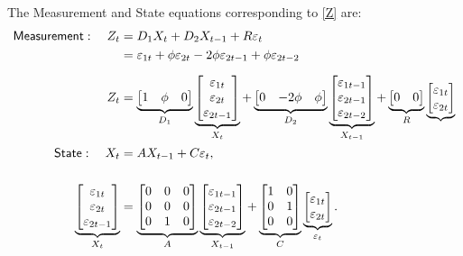 \documentclass[a4paper,12pt]{article}
\newcommand{\bsq}{\begin{subequations}}\newcommand{\esq}{\end{subequations}}
\begin{document}
The Measurement and State equations corresponding to \ref{Z} are:\bsq\label%
{K0SSM}%
\begin{align}
\mathsf{Measurement}:\quad Z_{t}& =D_{1}X_{t}+D_{2}X_{t-1}+R\varepsilon _{t}
\notag \\
& =\varepsilon _{1t}+\phi \varepsilon _{2t}-2\phi \varepsilon _{2t-1}+\phi
\varepsilon _{2t-2} \\[2mm]
Z_{t}& =\underbrace{%
\begin{bmatrix}
1 & \phi  & 0%
\end{bmatrix}%
}_{D_{1}}\underbrace{%
\begin{bmatrix}
\varepsilon _{1t} \\ 
\varepsilon _{2t} \\ 
\varepsilon _{2t-1}%
\end{bmatrix}%
}_{X_{t}}+\underbrace{%
\begin{bmatrix}
0 & -2\phi  & \phi 
\end{bmatrix}%
}_{D_{2}}\underbrace{%
\begin{bmatrix}
\varepsilon _{1t-1} \\ 
\varepsilon _{2t-1} \\ 
\varepsilon _{2t-2}%
\end{bmatrix}%
}_{X_{t-1}}+\underbrace{%
\begin{bmatrix}
0 & 0%
\end{bmatrix}%
}_{R}\underbrace{%
\begin{bmatrix}
\varepsilon _{1t} \\ 
\varepsilon _{2t}%
\end{bmatrix}%
} \\
\mathsf{State}:\quad X_{t}& =AX_{t-1}+C\varepsilon _{t},  \notag \\[5mm]
\underbrace{%
\begin{bmatrix}
\varepsilon _{1t} \\ 
\varepsilon _{2t} \\ 
\varepsilon _{2t-1}%
\end{bmatrix}%
}_{X_{t}}& =\underbrace{%
\begin{bmatrix}
0 & 0 & 0 \\ 
0 & 0 & 0 \\ 
0 & 1 & 0%
\end{bmatrix}%
}_{A}\underbrace{%
\begin{bmatrix}
\varepsilon _{1t-1} \\ 
\varepsilon _{2t-1} \\ 
\varepsilon _{2t-2}%
\end{bmatrix}%
}_{X_{t-1}}+\underbrace{%
\begin{bmatrix}
1 & 0 \\ 
0 & 1 \\ 
0 & 0%
\end{bmatrix}%
}_{C}\underbrace{%
\begin{bmatrix}
\varepsilon _{1t} \\ 
\varepsilon _{2t}%
\end{bmatrix}%
}_{\varepsilon _{t}}.
\end{align}%
\esq
\end{document}
